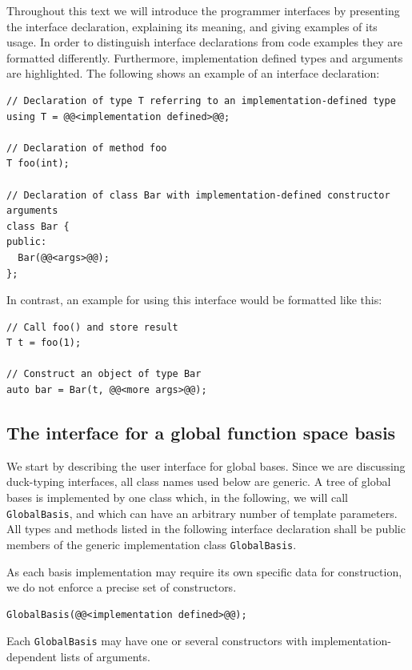 \documentclass[a4paper,10pt,headings=normal,bibliography=totoc]{scrartcl}
\newcommand{\cpp}[1]{\lstinline[basicstyle=\ttfamily]!#1!}
\begin{document}
Throughout this text we will introduce the programmer interfaces
by presenting the interface declaration, explaining
its meaning, and giving examples of its usage.
In order to distinguish interface declarations
from code examples they are formatted differently.
Furthermore, implementation defined types and arguments are highlighted.
The following shows an example of an interface declaration:
\begin{lstlisting}[style=Interface]
// Declaration of type T referring to an implementation-defined type
using T = @@<implementation defined>@@;

// Declaration of method foo
T foo(int);

// Declaration of class Bar with implementation-defined constructor arguments
class Bar {
public:
  Bar(@@<args>@@);
};
\end{lstlisting}
In contrast,
an example for using this interface would be formatted like this:
\begin{lstlisting}[style=Example]
// Call foo() and store result
T t = foo(1);

// Construct an object of type Bar
auto bar = Bar(t, @@<more args>@@);
\end{lstlisting}


\subsection{The interface for a global function space basis}
We start by describing the user interface for global bases.  Since we are discussing duck-typing interfaces,
all class names used below are generic. A tree of global bases is implemented by one class which,
in the following, we will call \cpp{GlobalBasis}, and which
can have an arbitrary number of template parameters.
All types and methods listed in the following
interface declaration shall be public members of
the generic implementation class \cpp{GlobalBasis}.

As each basis implementation may require its own specific data for construction,
we do not enforce a precise set of constructors.
\begin{lstlisting}[style=Interface]
GlobalBasis(@@<implementation defined>@@);
\end{lstlisting}
Each \cpp{GlobalBasis} may have
one or several constructors with implementation-depen\-dent lists of arguments.
\end{document}
